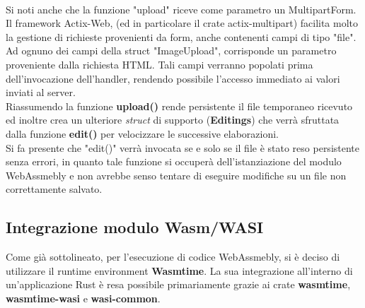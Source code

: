 \\Si noti anche che la funzione "upload" riceve come parametro un MultipartForm.
Il framework Actix-Web, (ed in particolare il crate actix-multipart) facilita molto la gestione di richieste provenienti da form, anche contenenti campi di tipo "file".
Ad ognuno dei campi della struct "ImageUpload", corrisponde un parametro proveniente dalla richiesta HTML. Tali campi verranno popolati prima dell'invocazione dell'handler, rendendo possibile l'accesso immediato ai valori inviati al server.
\\Riassumendo la funzione \textbf{upload()} rende persistente il file temporaneo ricevuto ed inoltre crea un ulteriore \emph{struct} di supporto (\textbf{Editings}) che verrà sfruttata dalla funzione \textbf{edit()} per velocizzare le successive elaborazioni.
\\Si fa presente che "edit()" verrà invocata se e solo se il file è stato reso persistente senza errori, in quanto tale funzione si occuperà dell'istanziazione del modulo WebAssmebly e non avrebbe senso tentare di eseguire modifiche su un file non correttamente salvato.
\subsection{Integrazione modulo Wasm/WASI}
Come già sottolineato, per l'esecuzione di codice WebAssmebly, si è deciso di utilizzare il runtime environment \textbf{Wasmtime}. La sua integrazione all'interno di un'applicazione Rust è resa possibile primariamente grazie ai crate \textbf{wasmtime}, \textbf{wasmtime-wasi} e \textbf{wasi-common}.
